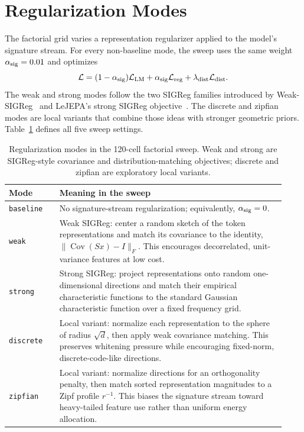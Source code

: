 \section{Regularization Modes}
\label{appendix:reg_modes}

The factorial grid varies a representation regularizer applied to the model's signature stream. For every non-baseline mode, the sweep uses the same weight $\alpha_{\rm sig}=0.01$ and optimizes
\begin{equation}
\mathcal L=(1-\alpha_{\rm sig})\mathcal L_{\rm LM}
+\alpha_{\rm sig}\mathcal L_{\rm reg}
+\lambda_{\rm dist}\mathcal L_{\rm dist}.
\end{equation}
The weak and strong modes follow the two SIGReg families introduced by Weak-SIGReg~\citep{weak_sigreg2026} and LeJEPA's strong SIGReg objective~\citep{lejepa2025}. The discrete and zipfian modes are local variants that combine those ideas with stronger geometric priors. Table~\ref{table:reg_modes} defines all five sweep settings.

\begin{table}[!ht]
\centering
\small
\begin{tabular}{p{0.17\linewidth}p{0.76\linewidth}}
\toprule
\textbf{Mode} & \textbf{Meaning in the sweep} \\
\midrule
\texttt{baseline} & No signature-stream regularization; equivalently, $\alpha_{\rm sig}=0$. \\
\texttt{weak} & Weak SIGReg: center a random sketch of the token representations and match its covariance to the identity, $\lVert\operatorname{Cov}(Sx)-I\rVert_F$. This encourages decorrelated, unit-variance features at low cost. \\
\texttt{strong} & Strong SIGReg: project representations onto random one-dimensional directions and match their empirical characteristic functions to the standard Gaussian characteristic function over a fixed frequency grid. \\
\texttt{discrete} & Local variant: normalize each representation to the sphere of radius $\sqrt d$, then apply weak covariance matching. This preserves whitening pressure while encouraging fixed-norm, discrete-code-like directions. \\
\texttt{zipfian} & Local variant: normalize directions for an orthogonality penalty, then match sorted representation magnitudes to a Zipf profile $r^{-1}$. This biases the signature stream toward heavy-tailed feature use rather than uniform energy allocation. \\
\bottomrule
\end{tabular}
\caption{Regularization modes in the 120-cell factorial sweep. Weak and strong are SIGReg-style covariance and distribution-matching objectives; discrete and zipfian are exploratory local variants.}
\label{table:reg_modes}
\end{table}
\FloatBarrier

